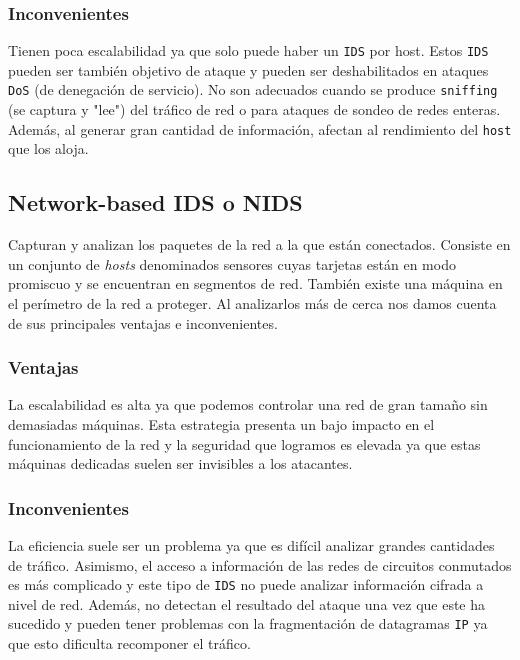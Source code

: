 \documentclass[12pt]{article}
\newcommand{\newpar} {
    \vskip 0.5cm
}
\begin{document}
            \subsubsection{Inconvenientes}
                Tienen poca escalabilidad ya que solo puede haber un \texttt{IDS} por host. Estos \texttt{IDS} pueden ser también objetivo de ataque y pueden ser deshabilitados en ataques \texttt{DoS} (de denegación de servicio). No son adecuados cuando se produce \texttt{sniffing} (se captura y "lee") del tráfico de red o para ataques de sondeo de redes enteras. Además, al generar gran cantidad de información, afectan al rendimiento del \texttt{host} que los aloja.


        \subsection{Network-based IDS o NIDS}
            Capturan y analizan los paquetes de la red a la que están conectados. Consiste en un conjunto de \textit{hosts} denominados sensores cuyas tarjetas están en modo promiscuo y se encuentran en segmentos de red. También existe una máquina en el perímetro de la red a proteger. Al analizarlos más de cerca nos damos cuenta de sus principales ventajas e inconvenientes.

            \subsubsection{Ventajas}
                La escalabilidad es alta ya que podemos controlar una red de gran tamaño sin demasiadas máquinas. Esta estrategia presenta un bajo impacto en el funcionamiento de la red y la seguridad que logramos es elevada ya que estas máquinas dedicadas suelen ser invisibles a los atacantes.

            \subsubsection{Inconvenientes}
                La eficiencia suele ser un problema ya que es difícil analizar grandes cantidades de tráfico. Asimismo, el acceso a información de las redes de circuitos conmutados es más complicado y este tipo de \texttt{IDS} no puede analizar información cifrada a nivel de red. Además, no detectan el resultado del ataque una vez que este ha sucedido y pueden tener problemas con la fragmentación de datagramas \texttt{IP} ya que esto dificulta recomponer el tráfico.

                \newpar
\end{document}
